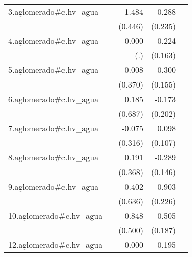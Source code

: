 {\begin{longtable}{l*{4}{D{.}{.}{-1}}}
\addlinespace
3.aglomerado#c.hv\_agua&                     &      -1.484\sym{***}&      -0.288         &                     \\
            &                     &     (0.446)         &     (0.235)         &                     \\
\addlinespace
4.aglomerado#c.hv\_agua&                     &       0.000         &      -0.224         &                     \\
            &                     &         (.)         &     (0.163)         &                     \\
\addlinespace
5.aglomerado#c.hv\_agua&                     &      -0.008         &      -0.300         &                     \\
            &                     &     (0.370)         &     (0.155)         &                     \\
\addlinespace
6.aglomerado#c.hv\_agua&                     &       0.185         &      -0.173         &                     \\
            &                     &     (0.687)         &     (0.202)         &                     \\
\addlinespace
7.aglomerado#c.hv\_agua&                     &      -0.075         &       0.098         &                     \\
            &                     &     (0.316)         &     (0.107)         &                     \\
\addlinespace
8.aglomerado#c.hv\_agua&                     &       0.191         &      -0.289\sym{*}  &                     \\
            &                     &     (0.368)         &     (0.146)         &                     \\
\addlinespace
9.aglomerado#c.hv\_agua&                     &      -0.402         &       0.903\sym{***}&                     \\
            &                     &     (0.636)         &     (0.226)         &                     \\
\addlinespace
10.aglomerado#c.hv\_agua&                     &       0.848         &       0.505\sym{**} &                     \\
            &                     &     (0.500)         &     (0.187)         &                     \\
\addlinespace
12.aglomerado#c.hv\_agua&                     &       0.000         &      -0.195         &                     \\

\end{longtable}}
